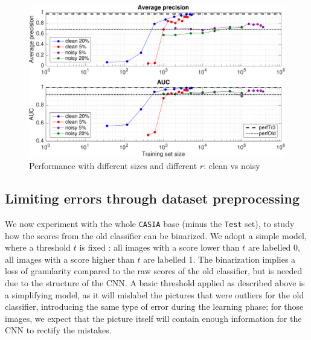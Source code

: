 \documentclass[a4paper]{article}
\begin{document}
            \begin{figure}[H]%
                \centering
                \includegraphics[width=12cm]{exp1/ap_auc}
                \caption{Performance with different sizes and different $r$: clean vs noisy}
            \end{figure}
            
    \subsection{Limiting errors through dataset preprocessing}\label{sec:preprocessing}
        We now experiment with the whole \texttt{CASIA} base (minus the \texttt{Test} set), to study how the scores from the old classifier can be binarized. We adopt a simple model, where a threshold $t$ is fixed : all images with a score lower than $t$ are labelled 0, all images with a score higher than $t$ are labelled 1. The binarization implies a loss of granularity compared to the raw scores of the old classifier, but is needed due to the structure of the CNN. A basic threshold applied as described above is a simplifying model, as it will mislabel the pictures that were outliers for the old classifier, introducing the same type of error during the learning phase; for those images, we expect that the picture itself will contain enough information for the CNN to rectify the mistakes.
        
\end{document}
